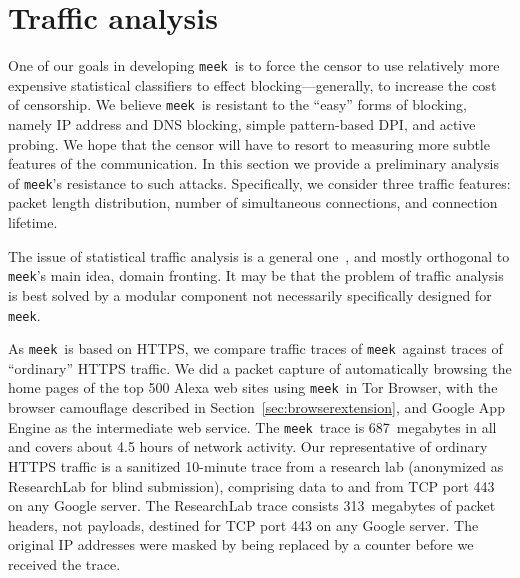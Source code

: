\documentclass[conference]{IEEEtran}
\newcommand{\meek}{\texttt{meek}\xspace}
\newcommand{\lbl}{ResearchLab\xspace}
\begin{document}
\section{Traffic analysis}
\label{sec:trafficanalysis}

One of our goals in developing \meek\ is to force
the censor to use relatively more expensive statistical classifiers
to effect blocking---generally, to increase the cost of censorship.
We believe \meek\ is resistant to the ``easy''
forms of blocking, namely IP address and DNS blocking,
simple pattern-based DPI,
and active probing.
We hope that the censor will have to resort to measuring
more subtle features of the communication.
In this section we provide a preliminary analysis
of \meek's resistance to such attacks.
Specifically, we consider three traffic features:
packet length distribution,
number of simultaneous connections,
and connection lifetime.

The issue of statistical traffic analysis is a general one~\cite{trafficmorphing},
and mostly orthogonal to \meek's main idea, domain fronting.
It may be that the problem of traffic analysis is
best solved by a modular component not
necessarily specifically designed for \meek.

As \meek\ is based on HTTPS,
we compare traffic traces of \meek\ against
traces of ``ordinary'' HTTPS traffic.
We did a packet capture
of automatically browsing the home pages
of the top 500 Alexa web sites using \meek\ in Tor Browser,
with the browser camouflage described in Section~\ref{sec:browserextension},
and Google App Engine as the intermediate web service.
The \meek\ trace is 687~megabytes in all
and covers about 4.5 hours of network activity.
Our representative of ordinary HTTPS traffic
is a sanitized 10-minute trace
from 
a research lab (anonymized as \lbl for blind submission),
comprising data to and from TCP port 443 on any Google server.
The \lbl trace consists 313~megabytes of packet headers,
not payloads, destined for TCP port 443 on any Google server.
The original IP addresses were masked by being
replaced by a counter before we received the trace.
\end{document}
